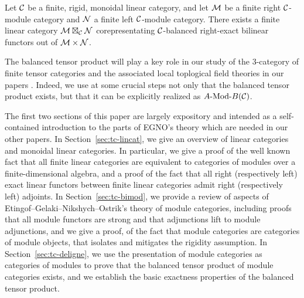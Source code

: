 \documentclass{amsart}
\begin{document}
\begin{theorem*}
Let $\mathcal C$ be a finite, rigid, monoidal linear category, and let $\mathcal M$ be a finite right $\mathcal C$-module category and $\mathcal N$ a finite left $\mathcal C$-module category.  There exists a finite linear category $\mathcal M \boxtimes_\mathcal C \mathcal N$ corepresentating $\mathcal C$-balanced right-exact bilinear functors out of $\mathcal M \times \mathcal N$.
\end{theorem*}

The balanced tensor product will play a key role in our study of the $3$-category of finite tensor categories and the associated local toplogical field theories in our papers \cite{3TC, DTCI}.  Indeed, we use at some crucial steps not only that the balanced tensor product exists, but that it can be explicitly realized as $\Mod{A}{B}(\cC)$.  

The first two sections of this paper are largely expository and intended as a self-contained introduction to the parts of EGNO's theory which are needed in our other papers.  In Section~\ref{sec:tc-lincat}, we give an overview of linear categories and monoidal linear categories.  In particular, we give a proof of the well known fact that all finite linear categories are equivalent to categories of modules over a finite-dimensional algebra, and a proof of the fact that all right (respectively left) exact linear functors between finite linear categories admit right (respectively left) adjoints.  In Section~\ref{sec:tc-bimod}, we provide a review of aspects of Etingof--Gelaki--Nikshych--Ostrik's theory of module categories, including proofs that all module functors are strong and that adjunctions lift to module adjunctions, and we give a proof, of the fact that module categories are categories of module objects, that isolates and mitigates the rigidity assumption.  In Section~\ref{sec:tc-deligne}, we use the presentation of module categories as categories of modules to prove that the balanced tensor product of module categories exists, and we establish the basic exactness properties of the balanced tensor product.


\end{document}
